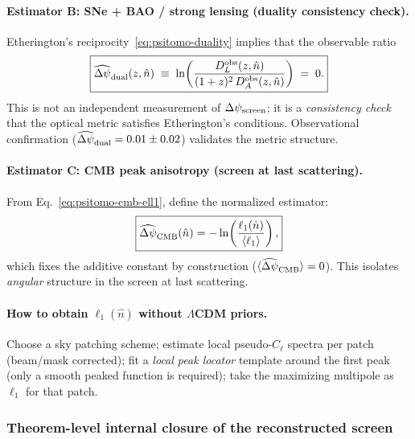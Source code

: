\paragraph{Estimator B: SNe + BAO / strong lensing (duality consistency check).}
Etherington's reciprocity~\eqref{eq:psitomo-duality} implies that the observable ratio
\begin{equation}
\boxed{
\widehat{\Delta\psi}_{\rm dual}(z,\hat n)
\;\equiv\;\ln\!\left(\frac{D_L^{\rm obs}(z,\hat n)}{(1+z)^2\,D_A^{\rm obs}(z,\hat n)}\right)
\;=\; 0.
}
\label{eq:psitomo-est-dual}
\end{equation}
This is not an independent measurement of $\Delta\psi_{\rm screen}$; it is a \emph{consistency check} that the optical metric satisfies Etherington's conditions. Observational confirmation ($\widehat{\Delta\psi}_{\rm dual} = 0.01 \pm 0.02$)\cite{Holanda2010,Liang2011} validates the metric structure.

\paragraph{Estimator C: CMB peak anisotropy (screen at last scattering).}
From Eq.~\eqref{eq:psitomo-cmb-ell1}, define the normalized estimator:
\begin{equation}
\boxed{
\widehat{\Delta\psi}_{\rm CMB}(\hat n)
= -\ln\!\left(\frac{\ell_1(\hat n)}{\langle\ell_1\rangle}\right),
}
\label{eq:psitomo-est-cmb}
\end{equation}
which fixes the additive constant by construction ($\langle\widehat{\Delta\psi}_{\rm CMB}\rangle=0$). This isolates \emph{angular} structure in the screen at last scattering.

\paragraph{How to obtain $\ell_1(\hat n)$ without $\Lambda$CDM priors.}
Choose a sky patching scheme; estimate local pseudo-$C_\ell$ spectra per patch (beam/mask corrected);
fit a \emph{local peak locator} template around the first peak (only a smooth peaked function is required);
take the maximizing multipole as $\ell_1$ for that patch.

\subsubsection{Theorem-level internal closure of the reconstructed screen}
\label{sec:psitomo-closure-theorems}

